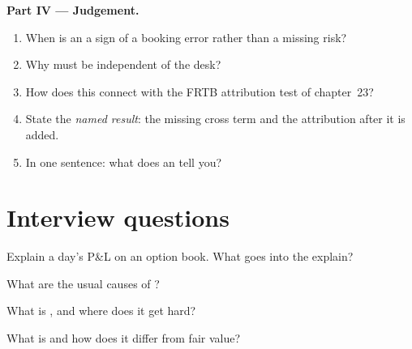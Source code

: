 \begin{problem}
\medskip\noindent\textbf{Part IV --- Judgement.}
\begin{enumerate}[resume]
\item When is an  a sign of a booking error rather than a missing risk?
\item Why must  be independent of the desk?
\item How does this connect with the FRTB attribution test of chapter~23?
\item State the \emph{named result}: the missing cross term and the attribution after it is added.
\item In one sentence: what does an  tell you?
\end{enumerate}
\end{problem}

\section{Interview questions}

\begin{interviewq}\label{iq:rc:pnl-explain-and-independent-price-verification:1}
Explain a day's P\&L on an option book. What goes into the explain?
\end{interviewq}

\begin{interviewq}\label{iq:rc:pnl-explain-and-independent-price-verification:2}
What are the usual causes of ?
\end{interviewq}

\begin{interviewq}\label{iq:rc:pnl-explain-and-independent-price-verification:3}
What is , and where does it get hard?
\end{interviewq}

\begin{interviewq}\label{iq:rc:pnl-explain-and-independent-price-verification:4}
What is  and how does it differ from fair value?
\end{interviewq}

